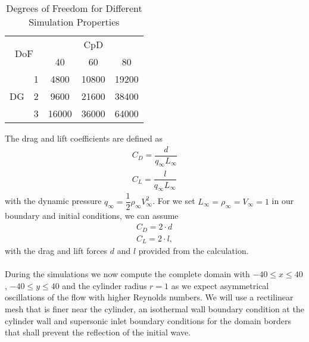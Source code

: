 	\begin{table}[htp]
		\centering
		\def\arraystretch{1.5}
			\begin{tabular}{|c|c|c|c|c|}
				\hline
				\multicolumn{2}{|c|}{\multirow{2}{*}{DoF}} & \multicolumn{3}{c|}{CpD} \\ \cline{3-5} 
				\multicolumn{2}{|c|}{}                       & 40     & 60    & 80    \\ \hline
				\multirow{3}{*}{DG}            & 1           &    4800    &    10800   &    19200    \\ \cline{2-5} 
				& 2           &    9600    &   21600    &    38400    \\ \cline{2-5} 
				& 3           &      16000  &   36000    &   64000     \\ \hline
			\end{tabular}
			\caption{Degrees of Freedom for Different Simulation Properties}	
			\label{DOF}
	\end{table}
	
	 The drag and lift coefficients are defined as
	\begin{align}
		C_D = \dfrac{d}{q_\infty L_\infty} \\
		C_L = \dfrac{l}{q_\infty L_\infty}
	\end{align}
	with the dynamic pressure $q_\infty = \dfrac{1}{2} \rho_\infty V_\infty^2$. For we set $L_\infty = \rho_\infty = V_\infty = 1$ in our boundary and initial conditions, we can assume
	\begin{align}
		C_D = 2 \cdot d \\
		C_L = 2 \cdot l,
	\end{align}
	with the drag and lift forces $d$ and $l$ provided from the calculation. \\\\
	During the simulations we now compute the complete domain with $-40 \leq x \leq 40$, $-40 \leq y \leq 40$ and the cylinder radius $r = 1$ as we expect asymmetrical oscillations of the flow with higher Reynolds numbers.
	We will use a rectilinear mesh that is finer near the cylinder, an isothermal wall boundary condition at the cylinder wall and supersonic inlet boundary conditions for the domain borders that shall prevent the reflection of the initial wave.  \\\\
	
